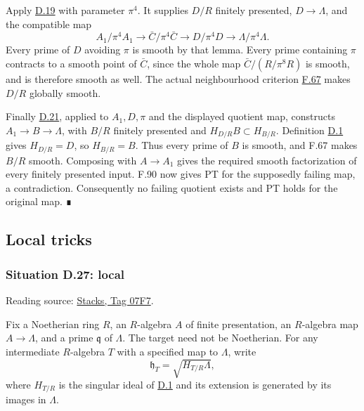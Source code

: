 \documentclass[11pt,a4paper,openany]{report}
\begin{document}
Apply \hyperref[AG-RG-S05-smoothing-lemma-lifting]{D.19} with parameter \(\pi^4\). It supplies \(D/R\) finitely presented, \(D\to\Lambda\), and the compatible map \[
A_1/\pi^4A_1\longrightarrow\bar C/\pi^4\bar C
\longrightarrow D/\pi^4D\longrightarrow\Lambda/\pi^4\Lambda.
\] Every prime of \(D\) avoiding \(\pi\) is smooth by that lemma. Every prime containing \(\pi\) contracts to a smooth point of \(\bar C\), since the whole map \(\bar C/(R/\pi^8R)\) is smooth, and is therefore smooth as well. The actual neighbourhood criterion \hyperref[AG-RG-S05-algebra-lemma-locally-smooth]{F.67} makes \(D/R\) globally smooth.

Finally \hyperref[AG-RG-S05-smoothing-lemma-desingularize-strictly-standard]{D.21}, applied to \(A_1,D,\pi\) and the displayed quotient map, constructs \(A_1\to B\to\Lambda\), with \(B/R\) finitely presented and \(H_{D/R}B\subset H_{B/R}\). Definition \hyperref[AG-RG-S05-smoothing-definition-singular-ideal]{D.1} gives \(H_{D/R}=D\), so \(H_{B/R}=B\). Thus every prime of \(B\) is smooth, and F.67 makes \(B/R\) smooth. Composing with \(A\to A_1\) gives the required smooth factorization of every finitely presented input. F.90 now gives PT for the supposedly failing map, a contradiction. Consequently no failing quotient exists and PT holds for the original map. ∎

\subsection{Local tricks}\label{AG-RG-S05-local-tricks}

\label{AG-RG-S05-smoothing-section-local}

\label{AG-RG-S05-smoothing-situation-local}

\subsubsection{Situation D.27: local}\label{AG-RG-S05-situation-d.27-local}

Reading source: \href{https://stacks.math.columbia.edu/tag/07F7}{Stacks, Tag 07F7}.

Fix a Noetherian ring \(R\), an \(R\)-algebra \(A\) of finite presentation, an \(R\)-algebra map \(A\to\Lambda\), and a prime \(\mathfrak q\) of \(\Lambda\). The target need not be Noetherian. For any intermediate \(R\)-algebra \(T\) with a specified map to \(\Lambda\), write \[
\mathfrak h_T=\sqrt{H_{T/R}\Lambda},
\] where \(H_{T/R}\) is the singular ideal of \hyperref[AG-RG-S05-smoothing-definition-singular-ideal]{D.1} and its extension is generated by its images in \(\Lambda\).
\end{document}
